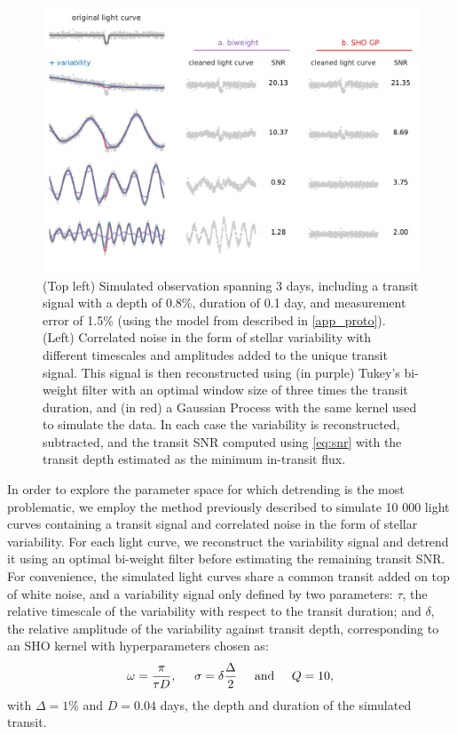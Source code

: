 \documentclass{aastex631}
\begin{document}
\begin{figure}[H]
    \begin{centering}
        \includegraphics[width=0.85\linewidth]{issue2.pdf}
        \caption{(Top left) Simulated observation spanning 3 days, including a transit signal with a depth of 0.8\%, duration of 0.1 day, and measurement error of 1.5\% (using the model from \cite{protopapas} described in \autoref{app_proto}). (Left) Correlated noise in the form of stellar variability with different timescales and amplitudes added to the unique transit signal. This signal is then reconstructed using (in purple) Tukey's bi-weight filter \citep{wotan} with an optimal window size of three times the transit duration, and (in red) a Gaussian Process with the same kernel used to simulate the data. In each case the variability is reconstructed, subtracted, and the transit SNR computed using \autoref{eq:snr} with the transit depth estimated as the minimum in-transit flux.}
        \label{fig:issue2}
    \end{centering}
\end{figure}
In order to explore the parameter space for which detrending is the most problematic, we employ the method previously described to simulate 10 000 light curves containing a transit signal and correlated noise in the form of stellar variability. For each light curve, we reconstruct the variability signal and detrend it using an optimal bi-weight filter before estimating the remaining transit SNR. For convenience, the simulated light curves share a common transit added on top of white noise, and a variability signal only defined by two parameters: $\tau$, the relative timescale of the variability with respect to the transit duration; and $\delta$, the relative amplitude of the variability against transit depth, corresponding to an SHO kernel with hyperparameters chosen as: 
\begin{equation}\label{eq:relative_params}
    \omega = \frac{\pi}{\tau D}, \hspace{0.5cm} 
    \sigma = \delta \frac{\Delta}{2} \hspace{0.5cm}  \text{and}  \hspace{0.5cm}  
    Q = 10,
\end{equation}
with $\Delta=1\%$ and $D=0.04$ days, the depth and duration of the simulated transit. 
\end{document}
